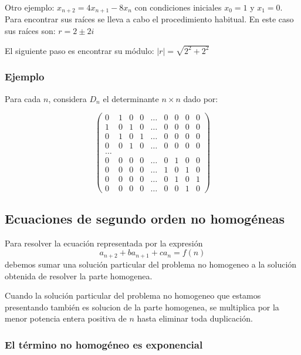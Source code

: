 \documentclass{article}
\begin{document}
 
Otro ejemplo: $x_{n+2}=4x_{n+1}-8x_n$ con condiciones iniciales
$x_0=1$ y $x_1=0$. Para encontrar sus raíces se lleva a cabo el
procedimiento habitual. En este caso sus raíces son: $r=2\pm2i$

El siguiente paso es encontrar su módulo: $|r|=\sqrt{2^2+2^2}$


\subsubsection{Ejemplo}

Para cada $n$, considera $D_{n}$ el determinante $n\times n$ dado por:

\begin{equation*}
\begin{pmatrix}
0 & 1 & 0 & 0 &\ldots & 0 & 0 & 0 & 0\\
1 & 0 & 1 & 0 &\ldots & 0 & 0 & 0 & 0\\
0 & 1 & 0 & 1 &\ldots & 0 & 0 & 0 & 0\\
0 & 0 & 1 & 0 &\ldots & 0 & 0 & 0 & 0\\
\ldots\\
0 & 0 & 0 & 0 &\ldots & 0 & 1 & 0 & 0\\
0 & 0 & 0 & 0 &\ldots & 1 & 0 & 1 & 0\\
0 & 0 & 0 & 0 &\ldots & 0 & 1 & 0 & 1\\
0 & 0 & 0 & 0 &\ldots & 0 & 0 & 1 & 0
\end{pmatrix}
\end{equation*}


\subsection{Ecuaciones de segundo orden no homogéneas}
\label{sec:nohomogeneas}

Para resolver la ecuación representada por la expresión
$$a_{n+2}+ba_{n+1}+ca_{n}=f(n)$$ debemos sumar una solución particular
del problema no homogeneo a la solución obtenida de resolver la parte
homogenea.

Cuando la solución particular del problema no homogeneo que estamos
presentando también es solucion de la parte homogenea, se multiplica
por la menor potencia entera positiva de $n$ hasta eliminar toda
duplicación.

\subsubsection{El término no homogéneo es exponencial}
\label{sec:exponencial}
\end{document}
